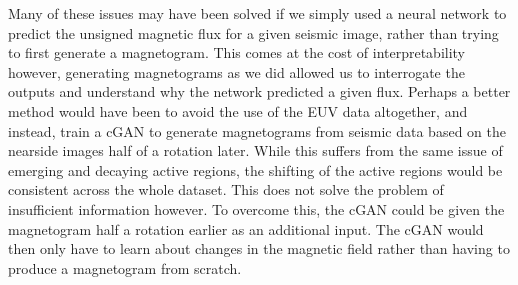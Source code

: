\documentclass[11pt,a4paper,onecolumn]{report}
\begin{document}
Many of these issues may have been solved if we simply used a neural network to
predict the unsigned magnetic flux for a given seismic image, rather than trying
to first generate a magnetogram. This comes at the cost of interpretability
however, generating magnetograms as we did allowed us to interrogate the outputs
and understand why the network predicted a given flux. Perhaps a better method
would have been to avoid the use of the EUV data altogether, and instead, train
a cGAN to generate magnetograms from seismic data based on the nearside images
half of a rotation later. While this suffers from the same issue of emerging and
decaying active regions, the shifting of the active regions would be consistent
across the whole dataset. This does not solve the problem of insufficient
information however. To overcome this, the cGAN could be given the magnetogram
half a rotation earlier as an additional input. The cGAN would then only have to
learn about changes in the magnetic field rather than having to produce a
magnetogram from scratch. \\






\end{document}
